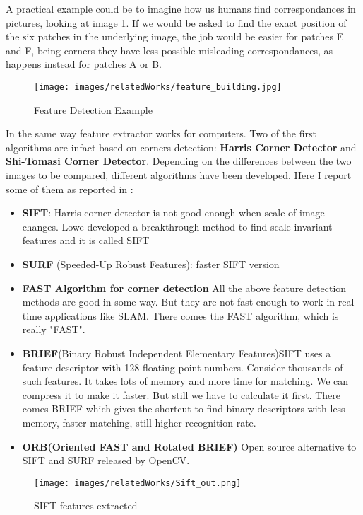  A practical example could be to imagine how us humans find correspondances in pictures, looking at image
 \ref{fig:sfm_opencv}. If we would be asked to find the exact position of the six patches in the underlying image,
the job would be easier for patches E and F, being corners they have less possible misleading correspondances, as happens
instead for patches A or B.
 \begin{figure}[H]
    \centering
    \texttt{[image: images/relatedWorks/feature\_building.jpg]} %
    \caption{Feature Detection Example \cite{open_cv}}
    \label{fig:sfm_opencv}
\end{figure}

In the same way feature extractor works for computers. Two of the first algorithms are infact based on corners detection: 
\textbf{Harris Corner Detector} and \textbf{Shi-Tomasi Corner Detector}.
Depending on the differences between the two images to be compared, different algorithms have been developed. Here I report 
some of them as reported in \cite{open_cv}:
\begin{itemize}
    \item \textbf{SIFT}: Harris corner detector is not good enough when scale of image changes. Lowe developed a breakthrough 
    method to find scale-invariant features and it is called SIFT
    \item \textbf{SURF} (Speeded-Up Robust Features): faster SIFT version
    \item \textbf{FAST Algorithm for corner detection} All the above feature detection methods are good in some way. But they 
    are not fast enough to work in real-time applications like SLAM. There comes the FAST algorithm, which is really "FAST".
    \item \textbf{BRIEF}(Binary Robust Independent Elementary Features)SIFT uses a feature descriptor with 128 floating point numbers.
     Consider thousands of such features. It takes lots of memory and more time for matching. We can compress it to make it
    faster. But still we have to calculate it first. There comes BRIEF which gives the shortcut to find binary descriptors with less memory, faster matching, still higher recognition rate.
    \item \textbf{ORB(Oriented FAST and Rotated BRIEF)} Open source alternative to SIFT and SURF released by OpenCV.
\end{itemize}
\begin{figure}
    \centerline{
    \texttt{[image: images/relatedWorks/Sift\_out.png]}} %
    \caption{SIFT features extracted}
    \label{fig:sift}
\end{figure}

